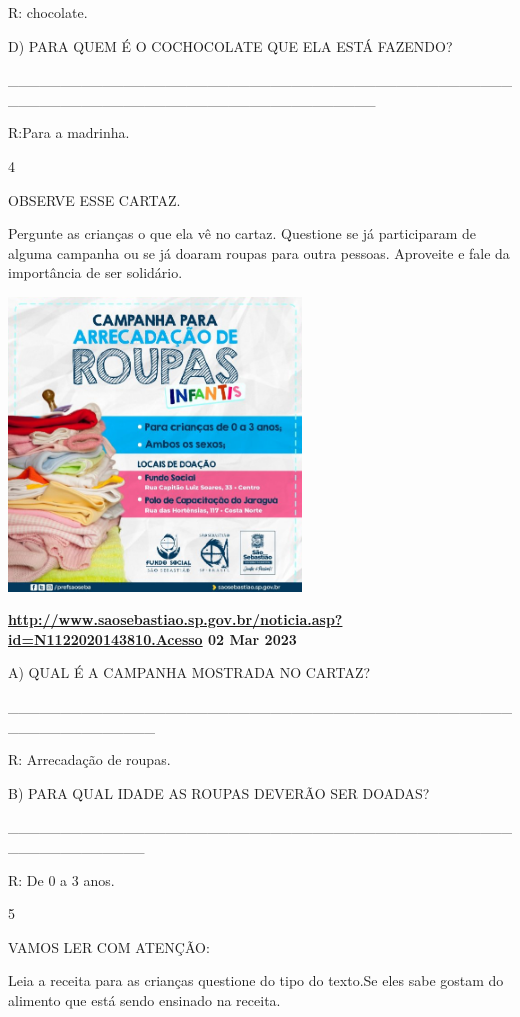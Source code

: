 {{R: chocolate.

D) PARA QUEM É O COCHOCOLATE QUE ELA ESTÁ FAZENDO?

\_\_\_\_\_\_\_\_\_\_\_\_\_\_\_\_\_\_\_\_\_\_\_\_\_\_\_\_\_\_\_\_\_\_\_\_\_\_\_\_\_\_\_\_\_\_\_\_\_\_\_\_\_\_\_\_\_\_\_\_\_\_\_\_\_\_\_\_\_\_\_\_\_\_\_\_\_\_\_\_\_\_\_

R:Para a madrinha.

\num{4}

OBSERVE ESSE CARTAZ.

Pergunte as crianças o que ela vê no cartaz. Questione se já
participaram de alguma campanha ou se já doaram roupas para outra
pessoas. Aproveite e fale da importância de ser solidário.

\includegraphics[width=3.06414in,height=3.07006in]{media/image83.jpeg}

\textbf{\url{http://www.saosebastiao.sp.gov.br/noticia.asp?id=N1122020143810.Acesso}
02 Mar 2023}

A) QUAL É A CAMPANHA MOSTRADA NO CARTAZ?

\_\_\_\_\_\_\_\_\_\_\_\_\_\_\_\_\_\_\_\_\_\_\_\_\_\_\_\_\_\_\_\_\_\_\_\_\_\_\_\_\_\_\_\_\_\_\_\_\_\_\_\_\_\_\_\_\_\_\_\_\_\_

R: Arrecadação de roupas.

B) PARA QUAL IDADE AS ROUPAS DEVERÃO SER DOADAS?

\_\_\_\_\_\_\_\_\_\_\_\_\_\_\_\_\_\_\_\_\_\_\_\_\_\_\_\_\_\_\_\_\_\_\_\_\_\_\_\_\_\_\_\_\_\_\_\_\_\_\_\_\_\_\_\_\_\_\_\_\_

R: De 0 a 3 anos.

\num{5}

VAMOS LER COM ATENÇÃO:

Leia a receita para as crianças questione do tipo do texto.Se eles sabe
gostam do alimento que está sendo ensinado na receita.

}}
